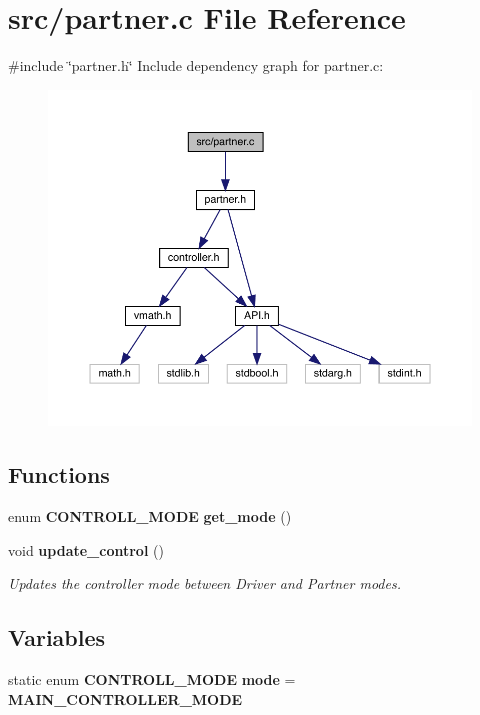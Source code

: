 \section{src/partner.c File Reference}
\label{partner_8c}
{\ttfamily \#include \char`\"{}partner.\+h\char`\"{}}\newline
Include dependency graph for partner.\+c\+:\nopagebreak
\begin{figure}[H]
\begin{center}
\leavevmode
\includegraphics[width=350pt]{partner_8c__incl}
\end{center}
\end{figure}
\subsection*{Functions}
\begin{DoxyCompactItemize}
\item 
enum \textbf{ C\+O\+N\+T\+R\+O\+L\+L\+\_\+\+M\+O\+DE} \textbf{ get\+\_\+mode} ()
\item 
void \textbf{ update\+\_\+control} ()
\begin{DoxyCompactList}\small\item\em Updates the controller mode between Driver and Partner modes. \end{DoxyCompactList}\end{DoxyCompactItemize}
\subsection*{Variables}
\begin{DoxyCompactItemize}
\item 
static enum \textbf{ C\+O\+N\+T\+R\+O\+L\+L\+\_\+\+M\+O\+DE} \textbf{ mode} = \textbf{ M\+A\+I\+N\+\_\+\+C\+O\+N\+T\+R\+O\+L\+L\+E\+R\+\_\+\+M\+O\+DE}
\end{DoxyCompactItemize}


